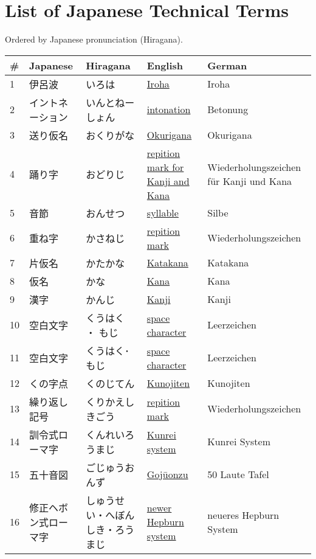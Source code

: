 \chapter{List of Japanese Technical Terms}
\label{chap:ListOfJapaneseTechnicalTerms}
\label{sec:JapaneseTechnicalTerms}
\normalsize Ordered by Japanese pronunciation (Hiragana).
\footnotesize\Padding
\begin{longtable}[c]{p{.5cm}p{3.5cm}p{4cm}p{3.5cm}p{3.5cm}}
\textbf{\#}&\textbf{Japanese}&\textbf{Hiragana}&\textbf{English}&\textbf{German}\\ \hline
1&伊呂波&いろは&\hyperref[sec:Iroha]{Iroha}&Iroha\\
2&イントネーション&いんとねーしょん&\hyperref[sec:Intonation]{intonation}&Betonung\\
3&送り仮名&おくりがな&\hyperref[sec:Okurigana]{Okurigana}&Okurigana\\
4&踊り字&おどりじ&\hyperref[sec:RepitionMarkForKanjiAndKana]{repition mark for Kanji and Kana}&Wiederholungszeichen für Kanji und Kana\\
5&音節&おんせつ&\hyperref[sec:Syllable]{syllable}&Silbe\\
6&重ね字&かさねじ&\hyperref[sec:RepitionMark]{repition mark}&Wiederholungszeichen\\
7&片仮名&かたかな&\hyperref[sec:Katakana]{Katakana}&Katakana\\
8&仮名&かな&\hyperref[sec:Kana]{Kana}&Kana\\
9&漢字&かんじ&\hyperref[sec:Kanji]{Kanji}&Kanji\\
10&空白文字&くうはく ・ もじ&\hyperref[sec:SpaceCharacter]{space character}&Leerzeichen\\
11&空白文字&くうはく･もじ&\hyperref[sec:SpaceCharacter]{space character}&Leerzeichen\\
12&くの字点&くのじてん&\hyperref[sec:Kunojiten]{Kunojiten}&Kunojiten\\
13&繰り返し記号&くりかえしきごう&\hyperref[sec:RepitionMark]{repition mark}&Wiederholungszeichen\\
14&訓令式ローマ字&くんれいろうまじ&\hyperref[sec:KunreiSystem]{Kunrei system}&Kunrei System\\
15&五十音図&ごじゅうおんず&\hyperref[sec:Gojuonzu]{Gojūonzu}&50 Laute Tafel\\
16&修正ヘボン式ローマ字&しゅうせい・へぼんしき・ろうまじ&\hyperref[sec:NewerHepburnSystem]{newer Hepburn system}&neueres Hepburn System\\

\end{longtable}
